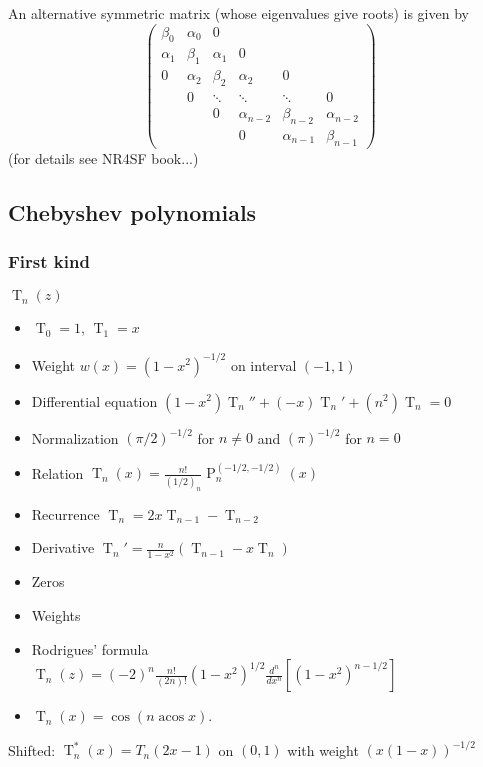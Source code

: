 \documentclass[10pt,dvipdfmx,letterpaper,twoside]{article}
\DeclareMathOperator{\acos}{acos}
\let\O=\operatorname
\let\al=\alpha
\begin{document}
An alternative symmetric matrix (whose eigenvalues give roots) is given by
\[\begin{pmatrix}
\beta_0 & \al_0 &   0 \\
\al_1 & \beta_1 & \al_1 &  0 \\
  0 & \al_2 & \beta_2 & \al_2 &  0 \\
    &  0  & \ddots & \ddots & \ddots & 0\\
    &     &   0 & \al_{n-2} & \beta_{n-2} & \al_{n-2} \\
    &     &     &       0 & \al_{n-1} & \beta_{n-1}
\end{pmatrix}\]
(for details see NR4SF book...)

\subsection{Chebyshev polynomials}

\subsubsection{First kind}
$\O{T}_n(z)$
\begin{itemize}
\item $\O{T}_0 = 1$, $\O{T}_1 = x$
\item Weight $w(x) = (1-x^2)^{-1/2}$ on interval $(-1,1)$
\item Differential equation $\left(1-x^2\right) \O{T}_n'' + \left(-x\right) \O{T}_n' + \left(n^2 \right) \O{T}_n = 0$
\item Normalization $(\pi/2)^{-1/2}$ for $n\neq0$ and $(\pi)^{-1/2}$ for $n=0$
\item Relation $\O{T}_n(x) = \frac{n!}{(1/2)_n} \O{P}_n^{(-1/2, -1/2)}(x)$
\item Recurrence $\O{T}_n = 2 x \O{T}_{n-1} - \O{T}_{n-2}$
\item Derivative $\O{T}_n' = \frac{n}{1-x^2}\left( \O{T}_{n-1} - x \O{T}_{n} \right)$
\item Zeros
\item Weights
\item Rodrigues' formula $\O{T}_n(z) = (-2)^n \frac{n!}{(2n)!} (1-x^2)^{1/2} \frac{d^n}{dx^n}\left[ (1-x^2)^{n-1/2} \right]$
\item $\O{T}_n(x) = \cos(n \acos x)$.
\end{itemize}
Shifted: $\O{T}^*_n(x) = T_n(2x-1)$ on $(0,1)$ with weight $(x(1-x))^{-1/2}$

\end{document}
